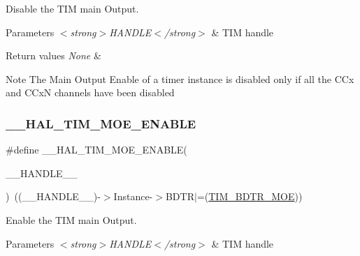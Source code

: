 Disable the T\+IM main Output. 


\begin{DoxyParams}{Parameters}
{\em $<$strong$>$\+H\+A\+N\+D\+L\+E$<$/strong$>$} & T\+IM handle \\
\hline
\end{DoxyParams}

\begin{DoxyRetVals}{Return values}
{\em None} & \\
\hline
\end{DoxyRetVals}
\begin{DoxyNote}{Note}
The Main Output Enable of a timer instance is disabled only if all the C\+Cx and C\+CxN channels have been disabled 
\end{DoxyNote}
\mbox{\label{group___t_i_m___exported___macros_ga04890dcef3ed061854721a3672585607}} 
\subsubsection{\texorpdfstring{\+\_\+\+\_\+\+H\+A\+L\+\_\+\+T\+I\+M\+\_\+\+M\+O\+E\+\_\+\+E\+N\+A\+B\+LE}{\_\_HAL\_TIM\_MOE\_ENABLE}}
{\footnotesize\ttfamily \#define \+\_\+\+\_\+\+H\+A\+L\+\_\+\+T\+I\+M\+\_\+\+M\+O\+E\+\_\+\+E\+N\+A\+B\+LE(\begin{DoxyParamCaption}\item[{}]{\+\_\+\+\_\+\+H\+A\+N\+D\+L\+E\+\_\+\+\_\+ }\end{DoxyParamCaption})~((\+\_\+\+\_\+\+H\+A\+N\+D\+L\+E\+\_\+\+\_\+)-\/$>$Instance-\/$>$B\+D\+TR$\vert$=(\hyperlink{group___peripheral___registers___bits___definition_ga277a096614829feba2d0a4fbb7d3dffc}{T\+I\+M\+\_\+\+B\+D\+T\+R\+\_\+\+M\+OE}))}



Enable the T\+IM main Output. 


\begin{DoxyParams}{Parameters}
{\em $<$strong$>$\+H\+A\+N\+D\+L\+E$<$/strong$>$} & T\+IM handle \\
\hline
\end{DoxyParams}


